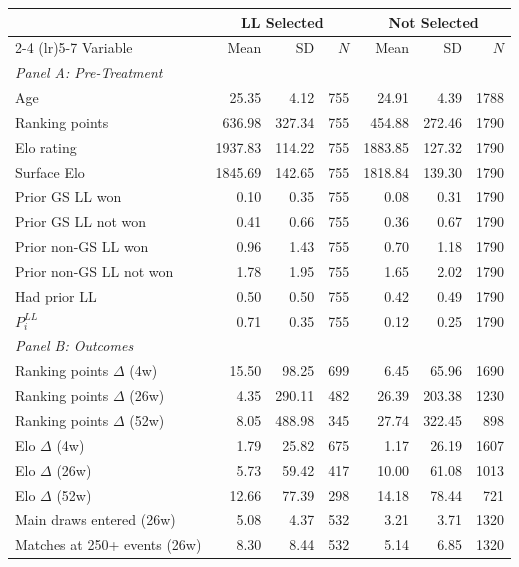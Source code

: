\begin{tabular}{p{4cm} rrr rrr}
\toprule
 & \multicolumn{3}{c}{LL Selected} & \multicolumn{3}{c}{Not Selected} \\
\cmidrule(lr){2-4} \cmidrule(lr){5-7}
Variable & Mean & SD & $N$ & Mean & SD & $N$ \\
\midrule
\multicolumn{7}{l}{\textit{Panel A: Pre-Treatment}} \\
\quad Age & 25.35 & 4.12 & 755 & 24.91 & 4.39 & 1788 \\
\quad Ranking points & 636.98 & 327.34 & 755 & 454.88 & 272.46 & 1790 \\
\quad Elo rating & 1937.83 & 114.22 & 755 & 1883.85 & 127.32 & 1790 \\
\quad Surface Elo & 1845.69 & 142.65 & 755 & 1818.84 & 139.30 & 1790 \\
\quad Prior GS LL won & 0.10 & 0.35 & 755 & 0.08 & 0.31 & 1790 \\
\quad Prior GS LL not won & 0.41 & 0.66 & 755 & 0.36 & 0.67 & 1790 \\
\quad Prior non-GS LL won & 0.96 & 1.43 & 755 & 0.70 & 1.18 & 1790 \\
\quad Prior non-GS LL not won & 1.78 & 1.95 & 755 & 1.65 & 2.02 & 1790 \\
\quad Had prior LL & 0.50 & 0.50 & 755 & 0.42 & 0.49 & 1790 \\
\quad $P_i^{LL}$ & 0.71 & 0.35 & 755 & 0.12 & 0.25 & 1790 \\
\midrule
\multicolumn{7}{l}{\textit{Panel B: Outcomes}} \\
\quad Ranking points $\Delta$ (4w) & 15.50 & 98.25 & 699 & 6.45 & 65.96 & 1690 \\
\quad Ranking points $\Delta$ (26w) & 4.35 & 290.11 & 482 & 26.39 & 203.38 & 1230 \\
\quad Ranking points $\Delta$ (52w) & 8.05 & 488.98 & 345 & 27.74 & 322.45 & 898 \\
\quad Elo $\Delta$ (4w) & 1.79 & 25.82 & 675 & 1.17 & 26.19 & 1607 \\
\quad Elo $\Delta$ (26w) & 5.73 & 59.42 & 417 & 10.00 & 61.08 & 1013 \\
\quad Elo $\Delta$ (52w) & 12.66 & 77.39 & 298 & 14.18 & 78.44 & 721 \\
\quad Main draws entered (26w) & 5.08 & 4.37 & 532 & 3.21 & 3.71 & 1320 \\
\quad Matches at 250+ events (26w) & 8.30 & 8.44 & 532 & 5.14 & 6.85 & 1320 \\
\bottomrule
\end{tabular}
